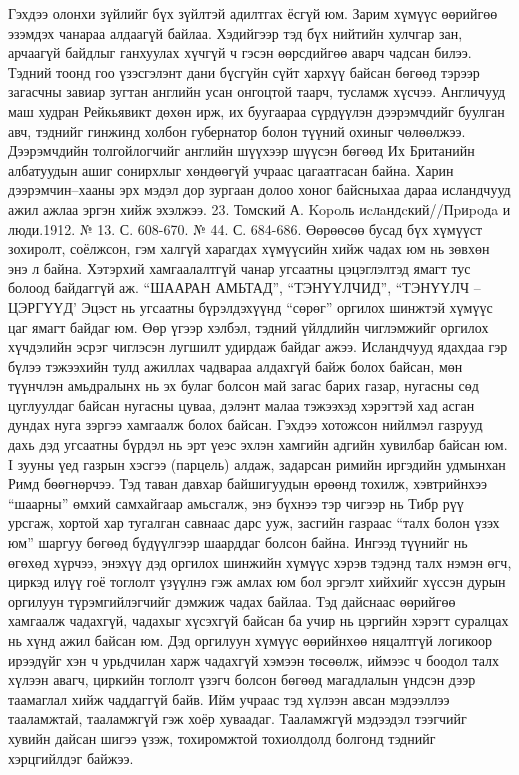 Гэхдээ олонхи зүйлийг бүх зүйлтэй адилтгах ёсгүй юм. Зарим хүмүүс өөрийгөө эзэмдэх чанараа алдаагүй байлаа. Хэдийгээр тэд бүх нийтийн хулчгар зан, арчаагүй байдлыг ганхуулах хүчгүй ч гэсэн өөрсдийгөө аварч чадсан билээ. Тэдний тоонд гоо үзэсгэлэнт дани бүсгүйн сүйт хархүү байсан бөгөөд тэрээр загасчны завиар зугтан английн усан онгоцтой таарч, тусламж хүсчээ. Англичууд маш худран Рейкьявикт дөхөн ирж, их буугаараа сүрдүүлэн дээрэмчдийг буулган авч, тэднийг гинжинд холбон губернатор болон түүний охиныг чөлөөлжээ. Дээрэмчдийн толгойлогчийг английн шүүхээр шүүсэн бөгөөд Их Британийн албатуудын ашиг сонирхлыг хөндөөгүй учраас цагаатгасан байна. Харин дээрэмчин–хааны эрх мэдэл дор зургаан долоо хоног байсныхаа дараа исландчууд ажил ажлаа эргэн хийж эхэлжээ. 23. Томский А. Kopoль иcлaндcкий//Пpиpoдa и люди.1912. № 13. С. 608-670. № 44. С. 684-686.
Өөрөөсөө бусад бүх хүмүүст зохиролт, соёлжсон, гэм халгүй харагдах хүмүүсийн хийж чадах юм нь зөвхөн энэ л байна. Хэтэрхий хамгаалалтгүй чанар угсаатны цэцэглэлтэд ямагт тус болоод байдаггүй аж.
“ШААРАН АМЬТАД”, “ТЭНҮҮЛЧИД”, “ТЭНҮҮЛЧ – ЦЭРГҮҮД’
Эцэст нь угсаатны бүрэлдэхүүнд “сөрөг” оргилох шинжтэй хүмүүс цаг ямагт байдаг юм. Өөр үгээр хэлбэл, тэдний үйлдлийн чиглэмжийг оргилох хүчдэлийн эсрэг чиглэсэн лугшилт удирдаж байдаг ажээ.
Исландчууд ядахдаа гэр бүлээ тэжээхийн тулд ажиллах чадвараа алдахгүй байж болох байсан, мөн түүнчлэн амьдралынх нь эх булаг болсон май загас барих газар, нугасны сөд цуглуулдаг байсан нугасны цуваа, дэлэнт малаа тэжээхэд хэрэгтэй хад асган дундах нуга зэргээ хамгаалж болох байсан. Гэхдээ хотожсон нийлмэл газрууд дахь дэд угсаатны бүрдэл нь эрт үеэс эхлэн хамгийн адгийн хувилбар байсан юм. I зууны үед газрын хэсгээ (парцель) алдаж, задарсан римийн иргэдийн удмынхан Римд бөөгнөрчээ. Тэд таван давхар байшигуудын өрөөнд тохилж, хэвтрийнхээ “шаарны” өмхий самхайгаар амьсгалж, энэ бүхнээ тэр чигээр нь Тибр рүү урсгаж, хортой хар тугалган савнаас дарс ууж, засгийн газраас “талх болон үзэх юм” шаргуу бөгөөд бүдүүлгээр шаарддаг болсон байна. Ингээд түүнийг нь өгөхөд хүрчээ, энэхүү дэд оргилох шинжийн хүмүүс хэрэв тэдэнд талх нэмэн өгч, циркэд илүү гоё тоглолт үзүүлнэ гэж амлах юм бол эргэлт хийхийг хүссэн дурын оргилуун түрэмгийлэгчийг дэмжиж чадах байлаа. Тэд дайснаас өөрийгөө хамгаалж чадахгүй, чадахыг хүсэхгүй байсан ба учир нь цэргийн хэрэгт суралцах нь хүнд ажил байсан юм. Дэд оргилуун хүмүүс өөрийнхөө няцалтгүй логикоор ирээдүйг хэн ч урьдчилан харж чадахгүй хэмээн төсөөлж, иймээс ч боодол талх хүлээн авагч, циркийн тоглолт үзэгч болсон бөгөөд магадлалын үндсэн дээр таамаглал хийж чаддаггүй байв. Ийм учраас тэд хүлээн авсан мэдээллээ тааламжтай, тааламжгүй гэж хоёр хуваадаг. Тааламжгүй мэдээдэл тээгчийг хувийн дайсан шигээ үзэж, тохиромжтой тохиолдолд болгонд тэднийг хэрцгийлдэг байжээ.
